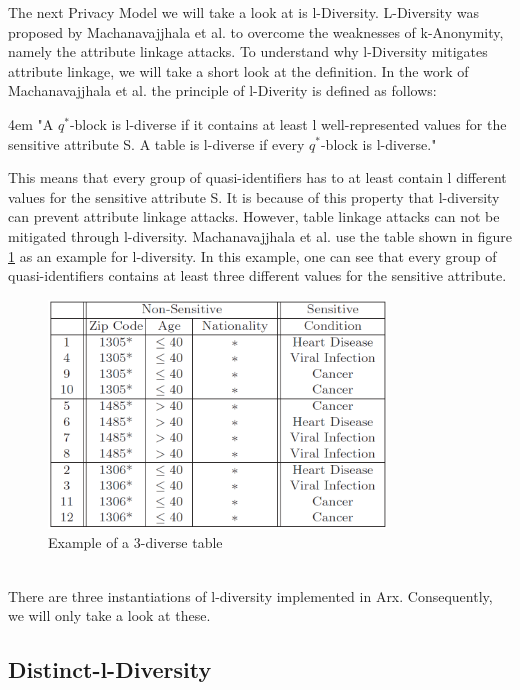\documentclass[12pt, a4paper,oneside]{report}
\begin{document}
The next Privacy Model we will take a look at is l-Diversity. L-Diversity was proposed by Machanavajjhala et al. to overcome the weaknesses of k-Anonymity, namely the attribute linkage attacks\cite{Machanavajjhala2006}. To understand why l-Diversity mitigates attribute linkage, we will take a short look at the definition. In the work of Machanavajjhala et al. the principle of l-Diverity is defined as follows:
\pagebreak
\par
\begingroup
\leftskip4em
\rightskip\leftskip
"A $q^*$-block is l-diverse if it contains at least l well-represented values for the sensitive attribute S. A table is l-diverse if every $q^*$-block is l-diverse." \cite{Machanavajjhala2006}\\
\par
\endgroup
This means that every group of quasi-identifiers has to at least contain l different values for the sensitive attribute S. It is because of this property that l-diversity can prevent attribute linkage attacks. However, table linkage attacks can not be mitigated through l-diversity\cite{Fung2010}. Machanavajjhala et al. use the table shown in figure \ref{fig:3} as an example for l-diversity. In this example, one can see that every group of quasi-identifiers contains at least three different values for the sensitive attribute.
\begin{figure}[h]
	\centering
	\includegraphics[width=0.8\textwidth]{l-diversity-example}
	\caption{Example of a 3-diverse table \cite{Machanavajjhala2006}}
	\label{fig:3}
\end{figure}\\
There are three instantiations of l-diversity implemented in Arx. Consequently, we will only take a look at these. 

\subsection{Distinct-l-Diversity}
\end{document}
